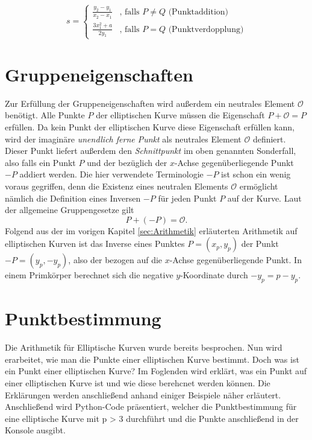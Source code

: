 $$s = \begin{cases}
	\frac{y_2 - y_1}{x_2 -x_1} & \text{, falls } P \neq Q \text{ (Punktaddition)}\\
	\frac{3x_1^2 + a}{2y_1} & \text{, falls } P = Q \text{ (Punktverdopplung)}
	\end{cases}
$$

\section{Gruppeneigenschaften} \label{sec:Gruppeneigenschaften}
Zur Erfüllung der Gruppeneigenschaften wird außerdem ein neutrales Element $\mathcal{O}$ benötigt. Alle Punkte $P$ der elliptischen Kurve müssen die Eigenschaft $P + \mathcal{O} = P$ erfüllen. Da kein Punkt der elliptischen Kurve diese Eigenschaft erfüllen kann, wird der imaginäre \textit{unendlich ferne Punkt} als neutrales Element $\mathcal{O}$ definiert. Dieser Punkt liefert außerdem den \textit{Schnittpunkt} im oben genannten Sonderfall, also falls ein Punkt $P$ und der bezüglich der $x$-Achse gegenüberliegende Punkt $-P$ addiert werden. Die hier verwendete Terminologie $-P$ ist schon ein wenig voraus gegriffen, denn die Existenz eines neutralen Elements $\mathcal{O}$ ermöglicht nämlich die Definition eines Inversen $-P$ für jeden Punkt $P$ auf der Kurve. Laut der allgemeine Gruppengesetze gilt $$P + (-P) = \mathcal{O}.$$
Folgend aus der im vorigen Kapitel \ref{sec:Arithmetik} erläuterten Arithmetik auf elliptischen Kurven ist das Inverse eines Punktes $P = (x_p, y_p)$ der Punkt $-P = (y_p, -y_p)$, also der bezogen auf die $x$-Achse gegenüberliegende Punkt. In einem Primkörper berechnet sich die negative $y$-Koordinate durch $-y_p = p - y_p$.\cite[279]{Paar.2016}

 
\section{Punktbestimmung}
Die Arithmetik für Elliptische Kurven wurde bereits besprochen. Nun wird erarbeitet, wie man die Punkte einer elliptischen Kurve bestimmt. Doch was ist ein Punkt einer elliptischen Kurve? Im Foglenden wird erklärt, was ein Punkt auf einer elliptischen Kurve ist und wie diese berehcnet werden können. Die Erklärungen werden anschließend anhand einiger Beispiele näher erläutert. Anschließend wird Python-Code präsentiert, welcher die Punktbestimmung für eine elliptische Kurve mit p > 3 durchführt und die Punkte anschließend in der Konsole ausgibt.

